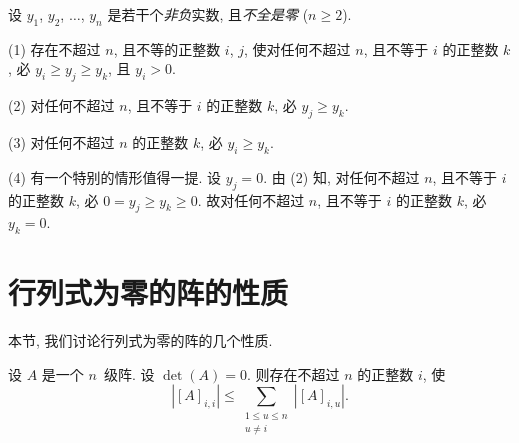 \begin{theorem}
    设 \(y_1\), \(y_2\), \(\dots\), \(y_n\) 是若干个\emph{非负}实数,
    且\emph{不全是零}
    (\(n \geq 2\)).

    (1)
    存在不超过 \(n\), 且不等的正整数 \(i\), \(j\),
    使对任何不超过 \(n\), 且不等于 \(i\) 的正整数 \(k\),
    必 \(y_i \geq y_j \geq y_k\),
    且 \(y_i > 0\).

    (2)
    对任何不超过 \(n\), 且不等于 \(i\) 的正整数 \(k\),
    必 \(y_j \geq y_k\).

    (3)
    对任何不超过 \(n\) 的正整数 \(k\),
    必 \(y_i \geq y_k\).

    (4)
    有一个特别的情形值得一提.
    设 \(y_j = 0\).
    由 (2) 知,
    对任何不超过 \(n\), 且不等于 \(i\) 的正整数 \(k\),
    必 \(0 = y_j \geq y_k \geq 0\).
    故对任何不超过 \(n\), 且不等于 \(i\) 的正整数 \(k\),
    必 \(y_k = 0\).
\end{theorem}

\section{行列式为零的阵的性质}

本节, 我们讨论行列式为零的阵的几个性质.

\begin{theorem}
    设 \(A\) 是一个 \(n\)~级阵.
    设 \(\det {(A)} = 0\).
    则存在不超过 \(n\) 的正整数 \(i\), 使
    \begin{equation}
        |[A]_{i,i}| \leq
        \sum_{\substack{1 \leq u \leq n \\
            u \neq i}} {|[A]_{i,u}|}.
        \label{eq:NonzeroDet1}
    \end{equation}
\end{theorem}

